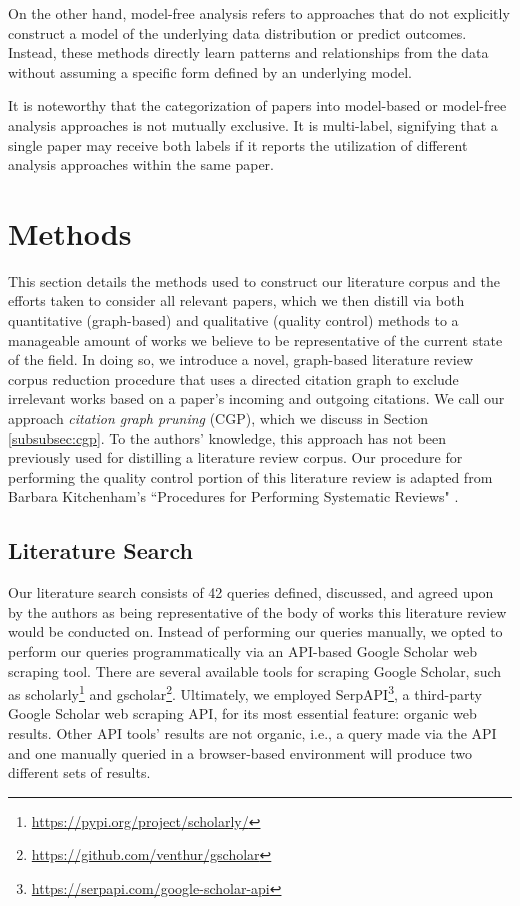 \documentclass[manuscript,screen,review]{acmart}
\begin{document}
On the other hand, model-free analysis refers to approaches that do not explicitly construct a model of the underlying data distribution or predict outcomes. Instead, these methods directly learn patterns and relationships from the data without assuming a specific form defined by an underlying model. 

It is noteworthy that the categorization of papers into model-based or model-free analysis approaches is not mutually exclusive. It is multi-label, signifying that a single paper may receive both labels if it reports the utilization of different analysis approaches within the same paper. 

\section{Methods} \label{sec:methods}


This section details the methods used to construct our literature corpus and the efforts taken to consider all relevant papers, which we then distill via both quantitative (graph-based) and qualitative (quality control) methods to a manageable amount of works we believe to be representative of the current state of the field. In doing so, we introduce a novel, graph-based literature review corpus reduction procedure that uses a directed citation graph to exclude irrelevant works based on a paper's incoming and outgoing citations. We call our approach \textit{citation graph pruning} (CGP), which we discuss in Section \ref{subsubsec:cgp}. To the authors' knowledge, this approach has not been previously used for distilling a literature review corpus. Our procedure for performing the quality control portion of this literature review is adapted from Barbara Kitchenham's ``Procedures for Performing Systematic Reviews" \cite{kitchenham2004procedures}.

\subsection{Literature Search} \label{subsec:literature_search}

Our literature search consists of 42 queries defined, discussed, and agreed upon by the authors as being representative of the body of works this literature review would be conducted on. Instead of performing our queries manually, we opted to perform our queries programmatically via an API-based Google Scholar web scraping tool. There are several available tools for scraping Google Scholar, such as scholarly\footnote{\href{https://pypi.org/project/scholarly/}{https://pypi.org/project/scholarly/}} and gscholar\footnote{\href{https://github.com/venthur/gscholar}{https://github.com/venthur/gscholar}}. Ultimately, we employed SerpAPI\footnote{\href{https://serpapi.com/google-scholar-api}{https://serpapi.com/google-scholar-api}}, a third-party Google Scholar web scraping API, for its most essential feature: organic web results. Other API tools' results are not organic, i.e., a query made via the API and one manually queried in a browser-based environment will produce two different sets of results.
\end{document}
